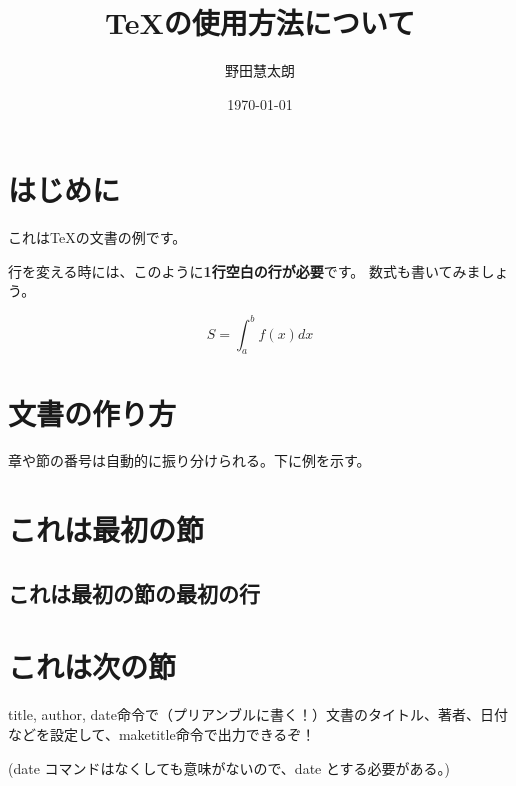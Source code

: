 \documentclass[a4paper, uplatex]{jlreq}
\title{\TeX の使用方法について}
\author{野田慧太朗}
\date{\today}
\newcommand{\明石}{明石工業高等専門がおっこう電機情報工学科}
\begin{document}
	\maketitle
	
	\tableofcontents
	
	
	\pagestyle{headings}
	
	\setcounter{page}{1}
	
	\newpage
	
	\section{はじめに}
	
	これは\TeX の文書の例です。
	
	行を変える時には、このように\textbf{1行空白の行が必要}です。
	数式も書いてみましょう。
	
	\[
	S=\int_a^b f(x) dx
	\]
	
	\section{文書の作り方}
	章や節の番号は自動的に振り分けられる。下に例を示す。
	
	\section{これは最初の節}
	
	\subsection{これは最初の節の最初の行}
	
	\section{これは次の節}
	title, author, date命令で（プリアンブルに書く！）文書のタイトル、著者、日付などを設定して、maketitle命令で出力できるぞ！
	
	(date コマンドはなくしても意味がないので、date{} とする必要がある。)
	
\end{document}
